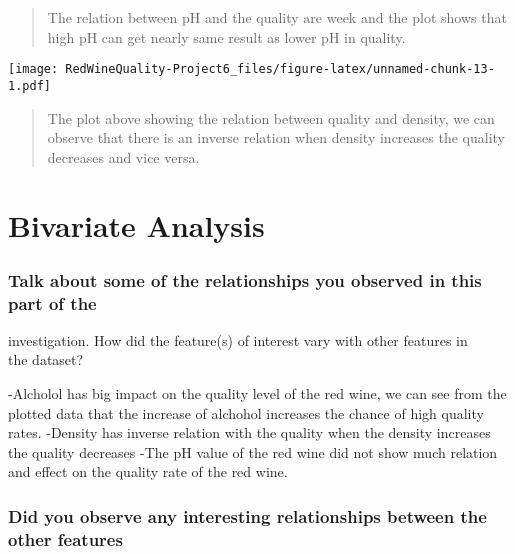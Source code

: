\documentclass[]{article}
\begin{document}
\begin{quote}
The relation between pH and the quality are week and the plot shows that
high pH can get nearly same result as lower pH in quality.
\end{quote}

\texttt{[image: RedWineQuality-Project6\_files/figure-latex/unnamed-chunk-13-1.pdf]}

\begin{quote}
The plot above showing the relation between quality and density, we can
observe that there is an inverse relation when density increases the
quality decreases and vice versa.
\end{quote}

\hypertarget{bivariate-analysis}{%
\section{Bivariate Analysis}\label{bivariate-analysis}}

\hypertarget{talk-about-some-of-the-relationships-you-observed-in-this-part-of-the}{%
\subsubsection{\texorpdfstring{Talk about some of the relationships you
observed in this part of the\\
}{Talk about some of the relationships you observed in this part of the }}\label{talk-about-some-of-the-relationships-you-observed-in-this-part-of-the}}

investigation. How did the feature(s) of interest vary with other
features in\\
the dataset?

-Alcholol has big impact on the quality level of the red wine, we can
see from the plotted data that the increase of alchohol increases the
chance of high quality rates. -Density has inverse relation with the
quality when the density increases the quality decreases -The pH value
of the red wine did not show much relation and effect on the quality
rate of the red wine.

\hypertarget{did-you-observe-any-interesting-relationships-between-the-other-features}{%
\subsubsection{\texorpdfstring{Did you observe any interesting
relationships between the other features\\
}{Did you observe any interesting relationships between the other features }}\label{did-you-observe-any-interesting-relationships-between-the-other-features}}
\end{document}
